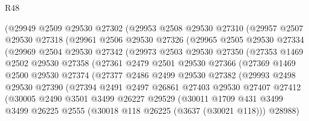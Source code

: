 \begin{lexlean}{R48}
\begin{coremodule}
          (@29949
            @2509
            @29530
            @27302
            (@29953
              @2508
              @29530
              @27310
              (@29957
                @2507
                @29530
                @27318
                (@29961
                  @2506
                  @29530
                  @27326
                  (@29965
                    @2505
                    @29530
                    @27334
                    (@29969
                      @2504
                      @29530
                      @27342
                      (@29973
                        @2503
                        @29530
                        @27350
                        (@27353
                          @1469
                          @2502
                          @29530
                          @27358
                          (@27361
                            @2479
                            @2501
                            @29530
                            @27366
                            (@27369
                              @1469
                              @2500
                              @29530
                              @27374
                              (@27377
                                @2486
                                @2499
                                @29530
                                @27382
                                (@29993
                                  @2498
                                  @29530
                                  @27390
                                  (@27394
                                    @2491
                                    @2497
                                    @26861
                                    @27403
                                    @29530
                                    @27407
                                    @27412
                                    (@30005
                                      @2490
                                      @3501
                                      @3499
                                      @26227
                                      @29529
                                      (@30011
                                        @1709
                                        @431
                                        @3499
                                        @3499
                                        @26225
                                        @2555
                                        (@30018 @118 @26225 (@3637 (@30021 @118)))
                                        @28988)

\end{coremodule}
\end{lexlean}
